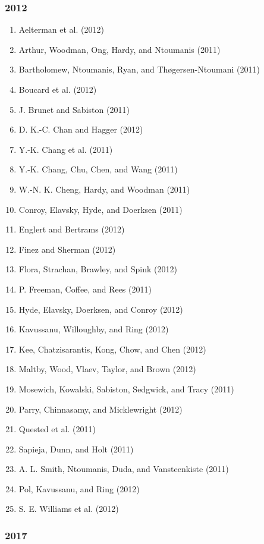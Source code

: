 \documentclass[english,man]{apa6}
\providecommand{\tightlist}{%
  \setlength{\itemsep}{0pt}\setlength{\parskip}{0pt}}
\theoremstyle{definition}
\theoremstyle{definition}
\theoremstyle{definition}
\theoremstyle{remark}
\begin{document}
\subsubsection{2012}\label{section-50}

\begin{enumerate}
\def\labelenumi{\arabic{enumi})}
\tightlist
\item
  Aelterman et al. (2012)
\item
  Arthur, Woodman, Ong, Hardy, and Ntoumanis (2011)
\item
  Bartholomew, Ntoumanis, Ryan, and Thøgersen-Ntoumani (2011)
\item
  Boucard et al. (2012)
\item
  J. Brunet and Sabiston (2011)
\item
  D. K.-C. Chan and Hagger (2012)
\item
  Y.-K. Chang et al. (2011)
\item
  Y.-K. Chang, Chu, Chen, and Wang (2011)
\item
  W.-N. K. Cheng, Hardy, and Woodman (2011)
\item
  Conroy, Elavsky, Hyde, and Doerksen (2011)
\item
  Englert and Bertrams (2012)
\item
  Finez and Sherman (2012)
\item
  Flora, Strachan, Brawley, and Spink (2012)
\item
  P. Freeman, Coffee, and Rees (2011)
\item
  Hyde, Elavsky, Doerksen, and Conroy (2012)
\item
  Kavussanu, Willoughby, and Ring (2012)
\item
  Kee, Chatzisarantis, Kong, Chow, and Chen (2012)
\item
  Maltby, Wood, Vlaev, Taylor, and Brown (2012)
\item
  Mosewich, Kowalski, Sabiston, Sedgwick, and Tracy (2011)
\item
  Parry, Chinnasamy, and Micklewright (2012)
\item
  Quested et al. (2011)
\item
  Sapieja, Dunn, and Holt (2011)
\item
  A. L. Smith, Ntoumanis, Duda, and Vansteenkiste (2011)
\item
  Pol, Kavussanu, and Ring (2012)
\item
  S. E. Williams et al. (2012)
\end{enumerate}

\subsubsection{2017}\label{section-51}
\end{document}
